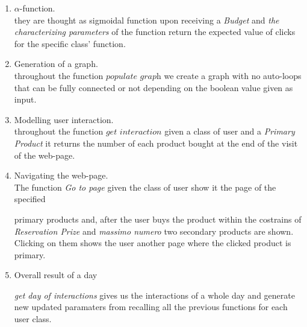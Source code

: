  \begin{enumerate}
     \item  $\alpha$-function. \\
            
            they are thought as sigmoidal function upon receiving a \textit{Budget} and \textit{the characterizing parameters} of the function return the expected         
            value of clicks for the specific class' function.
    
    \item Generation of a graph.\\
    
            throughout the function $\textit{populate graph}$ we create a graph with no auto-loops that can be fully connected or not depending on the boolean value               
            given as input.
    
    \item Modelling user interaction.\\
            
            throughout the function $\textit{get interaction}$ given a class of user and a  \textit{Primary Product} it returns the number of each product bought at               
            the end of the visit of the web-page.
    
    \item Navigating the web-page.\\
    
            The function \textit{Go to page} given the class of user show it the page of the specified
            
            primary products and, after the user buys the product within the costrains of \textit{Reservation Prize} and \textit{massimo numero} two secondary products             
            are shown. Clicking on them shows the user another page where the clicked product is primary.
     
    \item Overall result of a day
  
          \textit{get day of interactions} gives us the interactions of a whole day and generate new updated paramaters from recalling all the previous functions for             
          each user class.
      
      
\end{enumerate}


 
